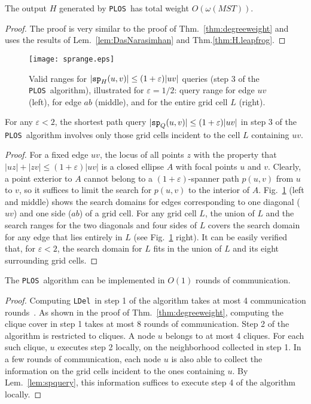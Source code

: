\documentclass{llncs}
\newcommand{\ABox}{
\raisebox{3pt}{\framebox[6pt]{\rule{6pt}{0pt}}}
}
\newcommand{\e}{\varepsilon}
\newcommand{\ssp}{{\tt sp}}
\newcommand{\palg}{{\tt PLOS}}
\newcommand{\N}{L}  \newcommand{\C}{C}
\newcommand{\ldel}{{\tt LDel}}
\newcommand{\w}{\omega}
\begin{document}
\begin{theorem}
The output $H$ generated by \palg\ has total weight $O(\w(MST))$.
\label{thm:pweight}
\end{theorem}
\begin{proof}
The proof is very similar to the proof of Thm.~\ref{thm:degreeweight} and uses the results of
Lem.~\ref{lem:DasNarasimhan} and Thm.\ref{thm:H.leapfrog}. \hfill\ABox
\end{proof}

\begin{figure}[htbp]
\centering
\texttt{[image: sprange.eps]}
\caption{Valid ranges for $|\ssp_H(u,v)| \le (1+\e)|uv|$ queries (step 3 of the \palg\ algorithm), illustrated for $\e = 1/2$: query range for edge $uv$ (left), for edge $ab$ (middle), and for the entire grid cell $L$ (right).}
\label{fig:sprange}
\end{figure}


\begin{lemma}
For any $\e < 2$, the shortest path query $|\ssp_{Q}(u,v)| \le (1+\e)|uv|$ in step 3 of the \palg\ algorithm involves
only those grid cells incident to the cell $\N$ containing $uv$.
\label{lem:spquery}
\end{lemma}
\begin{proof}
For a fixed edge $uv$, the locus of all points $z$ with the property that $|uz| + |zv| \le (1+\e)|uv|$ is a closed ellipse $A$ with focal points $u$ and $v$. Clearly, a point exterior to $A$ cannot belong to a $(1+\e)$-spanner path $p(u,v)$ from $u$ to $v$, so it suffices to limit the search for $p(u,v)$ to the interior of $A$. Fig.~\ref{fig:sprange} (left and middle) shows the search domains for edges corresponding to one diagonal ($uv$) and one side ($ab$) of a grid cell. For any grid cell $\N$, the union of $\N$ and the search ranges for the two diagonals and four sides of $\N$ covers the search domain for any edge that lies entirely in $\N$ (see Fig.~\ref{fig:sprange} right). It can be easily verified that, for $\e < 2$, the search domain for $\N$ fits in the union of $\N$ and its eight surrounding grid cells. \hfill\ABox
\end{proof}

\begin{theorem}
The \palg\ algorithm can be implemented in $O(1)$ rounds of communication.
\label{thm:communication}
\end{theorem}
\begin{proof}
Computing \ldel\ in step 1 of the algorithm takes at most 4 communication rounds~\cite{LCWW03}. As shown in the proof of Thm.~\ref{thm:degreeweight}, computing the clique cover in step 1 takes at most 8 rounds of communication.
Step 2 of the algorithm is restricted to cliques. A node $u$ belongs to at most 4 cliques. For each such clique, $u$ executes step 2 locally, on the neighborhood collected in step 1.
In a few rounds of communication, each node $u$ is also able to collect the information on the grid cells incident to the ones containing $u$. By Lem.~\ref{lem:spquery}, this information suffices to execute step 4 of the algorithm locally. \hfill\ABox
\end{proof}
\end{document}
